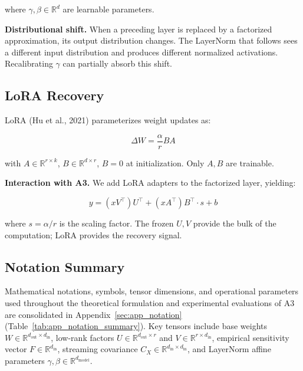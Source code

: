 where $\gamma, \beta \in \mathbb{R}^d$ are learnable parameters.

\textbf{Distributional shift.} When a preceding layer is replaced by a factorized 
approximation, its output distribution changes. The LayerNorm that follows 
sees a different input distribution and produces different normalized 
activations. Recalibrating $\gamma$ can partially absorb this shift.

\subsection{LoRA Recovery}

LoRA (Hu et al., 2021) parameterizes weight updates as:

\[
\Delta W = \frac{\alpha}{r} B A
\tag{3.10}
\]

with $A \in \mathbb{R}^{r \times k}$, $B \in \mathbb{R}^{d \times r}$, 
$B = 0$ at initialization. Only $A, B$ are trainable.

\textbf{Interaction with A3.} We add LoRA adapters to the factorized layer, 
yielding:

\[
y = (x V^\top) U^\top + (x A^\top) B^\top \cdot s + b
\tag{3.11}
\]

where $s = \alpha / r$ is the scaling factor. The frozen $U, V$ provide the 
bulk of the computation; LoRA provides the recovery signal.

\subsection{Notation Summary}
\label{sec:notation_summary}

Mathematical notations, symbols, tensor dimensions, and operational parameters used throughout the theoretical formulation and experimental evaluations of A3 are consolidated in Appendix~\ref{sec:app_notation} (Table~\ref{tab:app_notation_summary}). Key tensors include base weights $W \in \mathbb{R}^{d_{\mathrm{out}} \times d_{\mathrm{in}}}$, low-rank factors $U \in \mathbb{R}^{d_{\mathrm{out}} \times r}$ and $V \in \mathbb{R}^{r \times d_{\mathrm{in}}}$, empirical sensitivity vector $F \in \mathbb{R}^{d_{\mathrm{in}}}$, streaming covariance $C_X \in \mathbb{R}^{d_{\mathrm{in}} \times d_{\mathrm{in}}}$, and LayerNorm affine parameters $\gamma, \beta \in \mathbb{R}^{d_{\mathrm{model}}}$.
